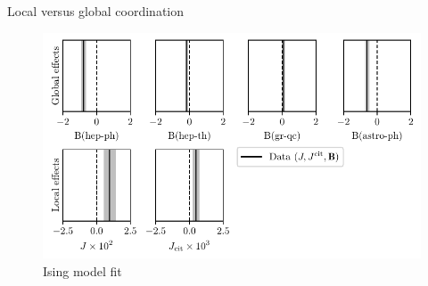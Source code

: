 \documentclass[10pt]{beamer}
\begin{document}
\begin{frame}{Local versus global coordination}
\begin{table}[h]
\centering
\caption{Parameters of the Ising model.}
\label{table:ising}
\begin{figure}
    \centering
    \includegraphics[width=0.8\linewidth]{fit.pdf}
    \caption{Ising model fit}
\end{figure}
\end{table}
\end{frame}
\end{document}
